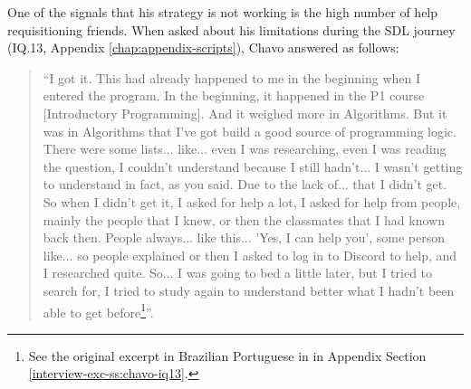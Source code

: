 One of the signals that his strategy is not working is the high number of help requisitioning friends. When asked about his limitations during the \gls{SDL} journey (\gls{IQ}.13, Appendix \ref{chap:appendix-scripts}), Chavo answered as follows:
\begin{quote}
    “I got it. This had already happened to me in the beginning when I entered the program. In the beginning, it happened in the P1 course [Introductory Programming]. And it weighed more in Algorithms. But it was in Algorithms that I've got build a good source of programming logic. There were some lists... like... even I was researching, even I was reading the question, I couldn't understand because I still hadn't... I wasn't getting to understand in fact, as you said. Due to the lack of... that I didn't get. So when I didn't get it, I asked for help a lot, I asked for help from people, mainly the people that I knew, or then the classmates that I had known back then. People always... like this... 'Yes, I can help you', some person like... so people explained or then I asked to log in to Discord to help, and I researched quite. So... I was going to bed a little later, but I tried to search for, I tried to study again to understand better what I hadn't been able to get before\footnote{See the original excerpt in Brazilian Portuguese in in Appendix Section \ref{interview-exc-ss:chavo-iq13}.}”.
\end{quote}

